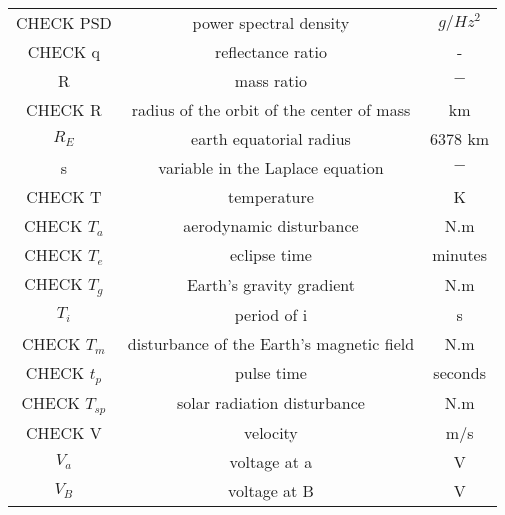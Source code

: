 \documentclass[11pt]{report}
\begin{document}
\begin{center}
\begin{longtable}{c|c|c}
CHECK PSD                              & power spectral density                       & $g/{Hz^2}$ \\

CHECK q                               & reflectance ratio                              & - \\

R 																	& mass ratio 																	& $-$ \\

CHECK R														& radius of the orbit of the center of mass 	& km \\

$R_E$ 															& earth equatorial radius 										& 6378 km \\

s 																	& variable in the Laplace equation 						& $-$ \\

CHECK T 																	& temperature 																& K \\

CHECK $T_a$                             & aerodynamic disturbance                           & N.m \\

CHECK $T_e$                              & eclipse time                             & minutes \\

CHECK $T_g$                          & Earth's gravity gradient                         & N.m \\

$T_i$ 															& period of i																	& s \\

CHECK $T_m$                         & disturbance of the Earth's magnetic field     & N.m \\

CHECK $t_p$                          & pulse time                         & seconds \\

CHECK $T_{sp}$                        & solar radiation disturbance                 & N.m \\

CHECK V																		& velocity																		& m/s \\

$V_a$ 															& voltage at a 																& V \\

$V_B$ 															& voltage at B 																& V \\


\end{longtable}
\end{center}
\end{document}
